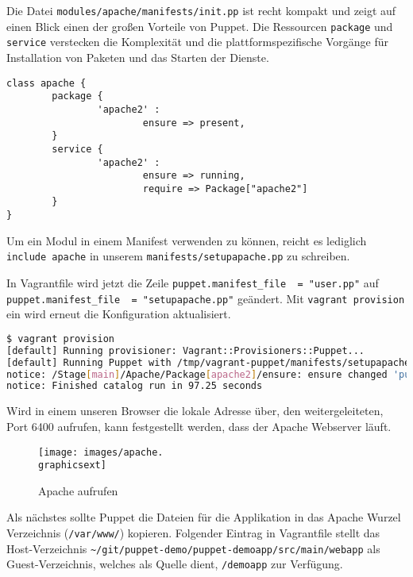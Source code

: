 \documentclass[12pt,a4paper,ngerman]{article}
\begin{document}
Die Datei \lstinline$modules/apache/manifests/init.pp$ ist recht kompakt und zeigt auf einen Blick einen der großen Vorteile von Puppet. Die Ressourcen \lstinline$package$ und \lstinline$service$ verstecken die Komplexität und die plattformspezifische Vorgänge für Installation von Paketen und das Starten der Dienste.
\begin{lstlisting}[language=puppet,caption=Inhalt von modules/apache/manifests/init.pp, label=apache-init.pp]
class apache {
        package {
                'apache2' :
                        ensure => present,
        }
        service {
                'apache2' :
                        ensure => running,
                        require => Package["apache2"]
        }
}
\end{lstlisting}

Um ein Modul in einem Manifest verwenden zu können, reicht es lediglich \lstinline[language=puppet]$include apache$ in unserem \lstinline$manifests/setupapache.pp$ zu schreiben.

In Vagrantfile wird jetzt die Zeile \lstinline$puppet.manifest_file  = "user.pp"$ auf \lstinline$puppet.manifest_file  = "setupapache.pp"$ geändert. Mit \lstinline$vagrant provision$ ein wird erneut die Konfiguration aktualisiert.

\begin{lstlisting}[language=sh,caption=vagrant provisioning für Apache, label=provisioning_apache]
$ vagrant provision
[default] Running provisioner: Vagrant::Provisioners::Puppet...
[default] Running Puppet with /tmp/vagrant-puppet/manifests/setupapache.pp...
notice: /Stage[main]/Apache/Package[apache2]/ensure: ensure changed 'purged' to 'present'
notice: Finished catalog run in 97.25 seconds
\end{lstlisting}

Wird in einem unseren Browser die lokale Adresse über, den weitergeleiteten, Port 6400 aufrufen, kann festgestellt werden, dass der Apache Webserver läuft.
\begin{figure}
  \begin{center}
    \texttt{[image: images/apache.\\graphicsext]}
  \end{center}
  \caption{Apache aufrufen}
  \label{apache}
\end{figure}

Als nächstes sollte Puppet die Dateien für die Applikation in das Apache Wurzel Verzeichnis (\lstinline$/var/www/$) kopieren. Folgender Eintrag in Vagrantfile stellt das Host-Verzeichnis \lstinline$~/git/puppet-demo/puppet-demoapp/src/main/webapp$ als Guest-Verzeichnis, welches als Quelle dient, \lstinline$/demoapp$ zur Verfügung.
\end{document}
